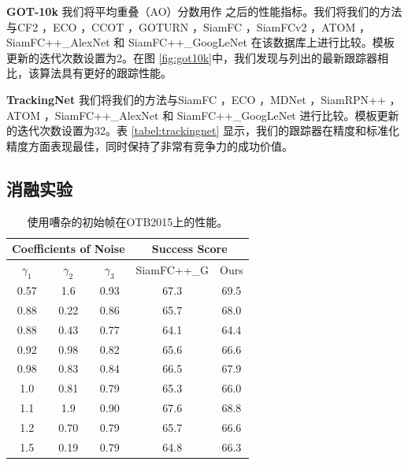\textbf{GOT-10k} 我们将平均重叠（AO）分数用作 \cite{GOT-10k}之后的性能指标。我们将我们的方法与CF2 \cite{CF2}，ECO \cite{danelljan2017eco}，CCOT \cite{CCOT}，GOTURN \cite{GOTURN}，SiamFC \cite{SiamFC}，SiamFCv2 \cite{valmadre2017end}，ATOM \cite{danelljan2019atom}，SiamFC++\_AlexNet \cite{SiamFC++} 和 SiamFC++\_GoogLeNet \cite{SiamFC++} 在该数据库上进行比较。模板更新的迭代次数设置为2。在图 \ref{fig:got10k}中，我们发现与列出的最新跟踪器相比，该算法具有更好的跟踪性能。

\textbf{TrackingNet} 我们将我们的方法与SiamFC \cite{SiamFC}，ECO \cite{danelljan2017eco}，MDNet \cite{nam2016learning}，SiamRPN++ \cite{SiamRPN++}，ATOM \cite{danelljan2019atom}，SiamFC++\_AlexNet \cite{SiamFC++} 和 SiamFC++\_GoogLeNet \cite{SiamFC++} 进行比较。模板更新的迭代次数设置为32。表 \ref{tabel:trackingnet} 显示，我们的跟踪器在精度和标准化精度方面表现最佳，同时保持了非常有竞争力的成功价值。

\subsection{消融实验}

\begin{table}[t]
\renewcommand\arraystretch{0.7}
\centering
\caption{使用嘈杂的初始帧在OTB2015上的性能。}
\begin{tabular}{c c c | c c}
\toprule
\multicolumn{3}{c|}{Coefficients of Noise} & \multicolumn{2}{c}{Success Score} \\
\midrule
$\gamma_1$ & $\gamma_2$ & $\gamma_3$  & SiamFC++\_G & Ours  \\
\midrule
0.57  &	1.6	 & 0.93	& 67.3    & 69.5 \\
0.88  & 0.22 & 0.86 & 65.7    & 68.0 \\
0.88  & 0.43 & 0.77 & 64.1    & 64.4 \\
0.92  & 0.98 & 0.82 & 65.6    & 66.6 \\
0.98  & 0.83 & 0.84 & 66.5    & 67.9 \\
1.0   & 0.81 & 0.79 & 65.3    & 66.0 \\
1.1   &	1.9  & 0.90	& 67.6    & 68.8 \\
1.2   & 0.70 & 0.79 & 65.7    & 66.6 \\
1.5   & 0.19 & 0.79 & 64.8    & 66.3 \\
\bottomrule
\end{tabular}
\label{table:noise}
\end{table}

